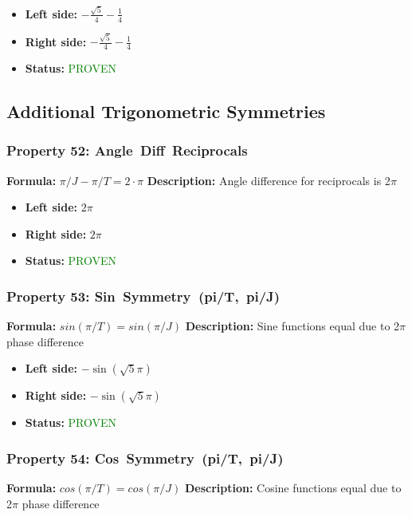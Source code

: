 \begin{itemize}
\item \textbf{Left side:} $- \frac{\sqrt{5}}{4} - \frac{1}{4}$
\item \textbf{Right side:} $- \frac{\sqrt{5}}{4} - \frac{1}{4}$
\item \textbf{Status:} \textcolor{green}{PROVEN}
\end{itemize}


\subsection{Additional Trigonometric Symmetries}

\subsubsection*{Property 52: Angle~Diff~Reciprocals}
\textbf{Formula:} $\pi/J - \pi/T = 2 \cdot \pi$
\textbf{Description:} Angle difference for reciprocals is 2$\pi$

\begin{itemize}
\item \textbf{Left side:} $2 \pi$
\item \textbf{Right side:} $2 \pi$
\item \textbf{Status:} \textcolor{green}{PROVEN}
\end{itemize}

\subsubsection*{Property 53: Sin~Symmetry~(pi/T,~pi/J)}
\textbf{Formula:} $sin(\pi/T) = sin(\pi/J)$
\textbf{Description:} Sine functions equal due to 2$\pi$ phase difference

\begin{itemize}
\item \textbf{Left side:} $- \sin{\left(\sqrt{5} \pi \right)}$
\item \textbf{Right side:} $- \sin{\left(\sqrt{5} \pi \right)}$
\item \textbf{Status:} \textcolor{green}{PROVEN}
\end{itemize}

\subsubsection*{Property 54: Cos~Symmetry~(pi/T,~pi/J)}
\textbf{Formula:} $cos(\pi/T) = cos(\pi/J)$
\textbf{Description:} Cosine functions equal due to 2$\pi$ phase difference

